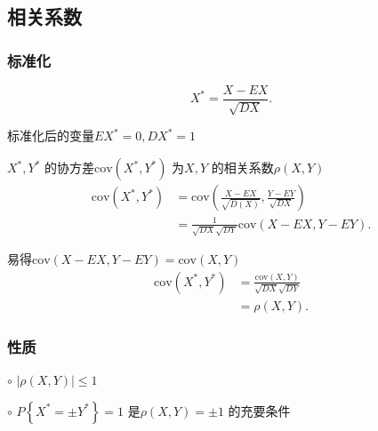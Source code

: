 \subsection{相关系数}%
\label{sub:相关系数}
\subsubsection{标准化}%
\label{subsub:标准化}
\[
    X^*=\frac{X-EX}{\sqrt{DX} } 
.\] 

标准化后的变量$EX^*=0,DX^*=1$

\begin{defi}
    $X^*,Y^*$ 的协方差$\text{cov}\left( X^*,Y^* \right) $ 为$X,Y$ 的相关系数$\rho\left( X,Y \right) $
    \begin{align*}
        \text{cov}\left( X^*,Y^* \right) &=\text{cov}\left( \frac{X-EX }{\sqrt{D\left( X \right) } } ,\frac{Y-EY}{\sqrt{DX} }  \right) \\
        &= \frac{1}{\sqrt{DX} \sqrt{DY} } \text{cov}\left( X-EX,Y-EY \right)
    .\end{align*}

    易得$\text{cov}\left( X-EX,Y-EY \right) =\text{cov}\left( X,Y \right) $
    \begin{align*}
        \text{cov}\left( X^*,Y^* \right) &= \frac{\text{cov}\left( X,Y \right) }{\sqrt{DX}\sqrt{DY} }  \\
        &= \rho\left( X,Y \right) 
    .\end{align*}
\end{defi}

\subsubsection{性质}%
\label{subsub:性质}
$\circ$ $\left| \rho\left( X,Y \right)  \right| \le 1$ 

$\circ$ $\displaystyle{P\left\{ X^*=\pm Y^* \right\} =1}$ 是$\rho\left( X,Y \right) =\pm1$ 的充要条件


